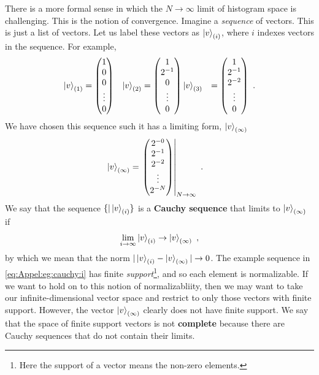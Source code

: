 \documentclass[12pt, oneside]{report}    %
\begin{document}
There is a more formal sense in which the $N\to\infty$ limit of histogram space is challenging. This is the notion of convergence. Imagine a \emph{sequence} of vectors. This is just a list of vectors. Let us label these vectors as $\left|v\right\rangle_{(i)}$, where $i$ indexes vectors in the sequence. For example,
\begin{align}
    \left|v\right\rangle_{(1)} &=
    \begin{pmatrix}
        1 \\ 0 \\ 0 \\ \vdots \\ 0
    \end{pmatrix}
    &
    \left|v\right\rangle_{(2)} &=
    \begin{pmatrix}
        1 \\ 2^{-1} \\ 0 \\ \vdots \\ 0
    \end{pmatrix}
    \left|v\right\rangle_{(3)} &=
    \begin{pmatrix}
        1 \\ 2^{-1} \\ 2^{-2} \\ \vdots \\ 0
    \end{pmatrix} \ .
    \label{eq:Appel:eg:cauchy:i}
\end{align}
We have chosen this sequence such it has a limiting form, $\left|v\right\rangle_{(\infty)}$
\begin{align}
    \left|v\right\rangle_{(\infty)} &=
    \left.
    \begin{pmatrix}
        2^{-0} \\ 2^{-1} \\ 2^{-2} \\ \vdots \\ 2^{-N}
    \end{pmatrix}
    \right|_{N\to\infty} \ .
    \label{eq:Appel:eg:cauchy:N}
\end{align}
We say that the sequence $\{|\left|v\right\rangle_{(i)}\}$ is a \textbf{Cauchy sequence} that limits to $\left|v\right\rangle_{(\infty)}$ if 
\begin{align}
    \lim_{i\to\infty} \left|v\right\rangle_{(i)} \to \left|v\right\rangle_{(\infty)} \ ,
\end{align}
by which we mean that the norm $|\left|v\right\rangle_{(i)}-\left|v\right\rangle_{(\infty)}|\to 0$.  The example sequence in \eqref{eq:Appel:eg:cauchy:i} has finite \emph{support}\footnote{Here the support of a vector means the non-zero elements.}, and so each element is normalizable. If we want to hold on to this notion of normalizabliity, then we may want to take our infinite-dimensional vector space and restrict to only those vectors with finite support. However, the vector $\left|v\right\rangle_{(\infty)}$ clearly does not have finite support. We say that the space of finite support vectors is not \textbf{complete} because there are Cauchy sequences that do not contain their limits.
\end{document}
